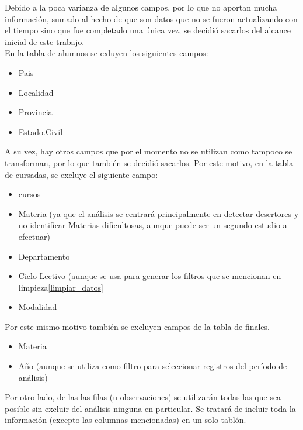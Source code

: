 
Debido a la poca varianza de algunos campos, por lo que no aportan mucha información, sumado al hecho de que son datos que no se fueron actualizando con el tiempo sino que fue completado una única vez, se decidió sacarlos del alcance inicial de este trabajo.\\

En la tabla de alumnos se exluyen los siguientes campos:
\begin{itemize}
\item Pais
\item Localidad
\item Provincia
\item Estado.Civil
\end{itemize}

A su vez, hay otros campos que por el momento no se utilizan como tampoco se transforman, por lo que también se decidió sacarlos.
Por este motivo, en la tabla de cursadas, se excluye el siguiente campo:
\begin{itemize}
	\item cursos
	\item Materia (ya que el análisis se centrará principalmente en detectar desertores y no identificar Materias dificultosas, aunque puede ser un segundo estudio a efectuar)
	\item Departamento
	\item Ciclo Lectivo (aunque se usa para generar los filtros que se mencionan en limpieza\ref{limpiar_datos}
	\item Modalidad
\end{itemize}

Por este mismo motivo también se excluyen campos de la tabla de finales.
\begin{itemize}
	\item Materia
	\item Año (aunque se utiliza como filtro para seleccionar registros del período de análisis)
\end{itemize}

Por otro lado, de las las filas (u observaciones) se utilizarán todas las que sea posible sin excluir del análisis ninguna en particular. Se tratará de incluir toda la información (excepto las columnas mencionadas) en un solo tablón.

